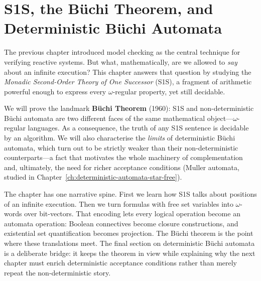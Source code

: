 
\chapter{S1S, the Büchi Theorem, and Deterministic Büchi Automata}
\label{ch:s1s-buchi}

The previous chapter introduced model checking as the central technique for
verifying reactive systems.  But what, mathematically, are we allowed to
\emph{say} about an infinite execution?  This chapter answers that question
by studying the \emph{Monadic Second-Order Theory of One Successor} (S1S),
a fragment of arithmetic powerful enough to express every $\omega$-regular
property, yet still decidable.

We will prove the landmark \textbf{Büchi Theorem} (1960): S1S and
non-deterministic Büchi automata are two different faces of the same
mathematical object---$\omega$-regular languages.  As a consequence,
the truth of any S1S sentence is decidable by an algorithm.  We will
also characterise the \emph{limits} of deterministic Büchi automata,
which turn out to be strictly weaker than their non-deterministic
counterparts---a fact that motivates the whole machinery of
complementation and, ultimately, the need for richer acceptance
conditions (Muller automata, studied in Chapter~\ref{ch:deterministic-automata-star-free}).

The chapter has one narrative spine.  First we learn how S1S talks about
positions of an infinite execution.  Then we turn formulas with free set
variables into $\omega$-words over bit-vectors.  That encoding lets every
logical operation become an automata operation: Boolean connectives become
closure constructions, and existential set quantification becomes
projection.  The Büchi theorem is the point where these translations meet.
The final section on deterministic Büchi automata is a deliberate bridge:
it keeps the theorem in view while explaining why the next chapter must
enrich deterministic acceptance conditions rather than merely repeat the
non-deterministic story.

